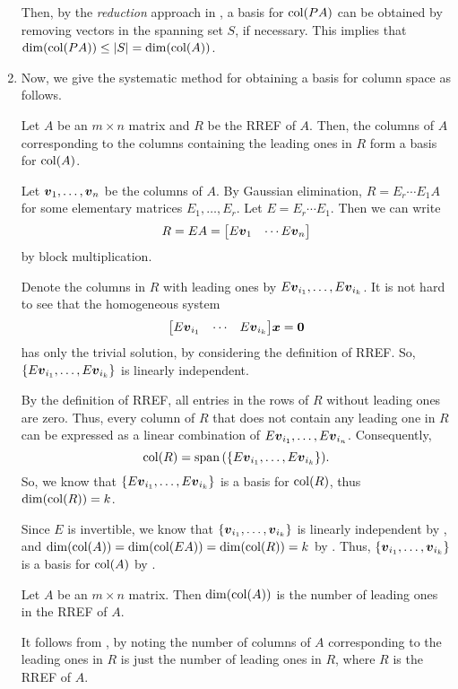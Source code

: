 \begin{enumerate}
\begin{pf}
Then, by the \emph{reduction} approach in , a
basis for \(\operatorname{col}(PA)\) can be obtained by removing vectors in the spanning set
\(S\), if necessary. This implies that \(\dim(\operatorname{col}(PA))\le |S|=\dim(\operatorname{col}(A))\).
\end{pf}

\item Now, we give the systematic method for obtaining a basis for column space
as follows.
\begin{theorem}
\label{thm:find-col-space-basis}
Let \(A\) be an \(m\times n\) matrix and \(R\) be the RREF of \(A\). Then, the
columns of \(A\) corresponding to the columns containing the leading ones in
\(R\) form a basis for \(\operatorname{col}(A)\).
\end{theorem}
\begin{pf}
Let \(\vb*{v}_1,\dotsc,\vb*{v}_n\) be the columns of \(A\). By Gaussian
elimination, \(R=E_r\dotsb E_1A\) for some elementary matrices
\(E_1,\dotsc,E_r\). Let \(E=E_r\dotsb E_1\). Then we can write
\[
R=EA=\mqty[E\vect{v}_1&\cdots E\vect{v}_n]
\]
by block multiplication.

Denote the columns in \(R\) with leading ones by
\(E\vb*{v}_{i_1},\dotsc,E\vb*{v}_{i_k}\). It is not hard to see that the
homogeneous system
\[
\mqty[E\vect{v}_{i_1}&\cdots&E\vect{v}_{i_k}]\vect{x}=\vect{0}
\]
has only the trivial solution, by considering the definition of RREF.  So,
\(\{E\vb*{v}_{i_1},\dotsc,E\vb*{v}_{i_k}\}\) is linearly independent.

By the definition of RREF, all entries in the rows of \(R\) without leading
ones are zero. Thus, every column of \(R\) that does not contain any leading
one in \(R\) can be expressed as a linear combination of
\(E\vb*{v}_{i_1},\dotsc,E\vb*{v}_{i_n}\). Consequently,
\[
\operatorname{col}(R)=\operatorname{span}\qty(\{E\vb*{v}_{i_1},\dotsc,E\vb*{v}_{i_k}\}).
\]
So, we know that \(\{E\vb*{v}_{i_1},\dotsc,E\vb*{v}_{i_k}\}\) is a basis for
\(\operatorname{col}(R)\), thus \(\dim(\operatorname{col}(R))=k\).

Since \(E\) is invertible, we know that
\(\{\vb*{v}_{i_1},\dotsc,\vb*{v}_{i_k}\}\) is linearly independent by
, and
\(\dim(\operatorname{col}(A))=\dim(\operatorname{col}(EA))=\dim(\operatorname{col}(R))=k\) by
. Thus,
\(\{\vb*{v}_{i_1},\dotsc,\vb*{v}_{i_k}\}\) is a basis for \(\operatorname{col}(A)\) by
.
\end{pf}

\begin{corollary}
\label{cor:dim-col-space-num-lead-ones}
Let \(A\) be an \(m\times n\) matrix. Then \(\dim(\operatorname{col}(A))\) is the number of
leading ones in the RREF of \(A\).
\end{corollary}
\begin{pf}
It follows from , by noting the number of
columns of \(A\) corresponding to the leading ones in \(R\) is just the number
of leading ones in \(R\), where \(R\) is the RREF of \(A\).
\end{pf}
\end{enumerate}
